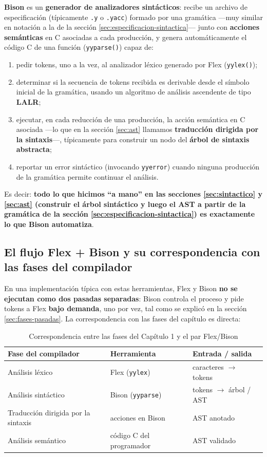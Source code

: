 \documentclass[11pt,a4paper]{article}
\begin{document}
\textbf{Bison} es un \textbf{generador de analizadores sintácticos}: recibe un archivo de
especificación (típicamente \texttt{.y} o \texttt{.yacc}) formado por una gramática —muy similar
en notación a la de la sección \ref{sec:especificacion-sintactica}— junto con \textbf{acciones
semánticas} en C asociadas a cada producción, y genera automáticamente el código C de una
función (\texttt{yyparse()}) capaz de:

\begin{enumerate}
    \item pedir tokens, uno a la vez, al analizador léxico generado por Flex (\texttt{yylex()});
    \item determinar si la secuencia de tokens recibida es derivable desde el símbolo inicial de
    la gramática, usando un algoritmo de análisis ascendente de tipo \textbf{LALR};
    \item ejecutar, en cada reducción de una producción, la acción semántica en C asociada —lo
    que en la sección \ref{sec:ast} llamamos \textbf{traducción dirigida por la sintaxis}—,
    típicamente para construir un nodo del \textbf{árbol de sintaxis abstracta};
    \item reportar un error sintáctico (invocando \texttt{yyerror}) cuando ninguna producción de
    la gramática permite continuar el análisis.
\end{enumerate}

Es decir: \textbf{todo lo que hicimos ``a mano'' en las secciones \ref{sec:sintactico} y
\ref{sec:ast} (construir el árbol sintáctico y luego el AST a partir de la gramática de la
sección \ref{sec:especificacion-sintactica}) es exactamente lo que Bison automatiza}.

\subsection{El flujo Flex + Bison y su correspondencia con las fases del compilador}

En una implementación típica con estas herramientas, Flex y Bison \textbf{no se ejecutan como
dos pasadas separadas}: Bison controla el proceso y pide tokens a Flex \textbf{bajo demanda},
uno por vez, tal como se explicó en la sección \ref{sec:fases-pasadas}. La correspondencia con
las fases del capítulo es directa:

\begin{table}[H]
\centering
\begin{tabular}{lll}
\toprule
\textbf{Fase del compilador} & \textbf{Herramienta} & \textbf{Entrada / salida} \\
\midrule
Análisis léxico & Flex (\texttt{yylex}) & caracteres $\to$ tokens \\
Análisis sintáctico & Bison (\texttt{yyparse}) & tokens $\to$ árbol / AST \\
Traducción dirigida por la sintaxis & acciones en Bison & AST anotado \\
Análisis semántico & código C del programador & AST validado \\
\bottomrule
\end{tabular}
\caption{Correspondencia entre las fases del Capítulo 1 y el par Flex/Bison}
\label{tab:flex-bison-fases}
\end{table}
\end{document}

